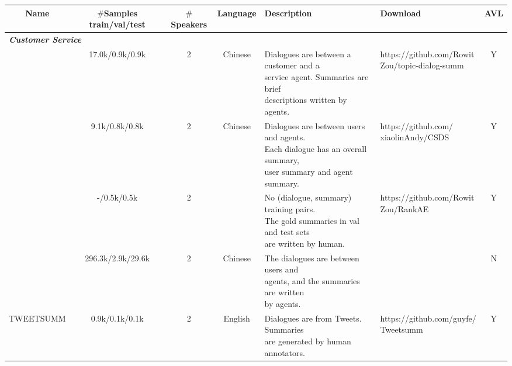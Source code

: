 \begin{sidewaystable}[thp]
	\centering
	\rule{0\textheight}{0.7\textheight}
	\begin{tabular}{|c|c|c|c|l|l|c|}
		
		\hline
		Name & \makecell{$\#$Samples \\ train/val/test} & $\#$Speakers & Language & Description & Download & AVL \\
		\hline
		\multicolumn{7}{|l|}{\bf \em{Customer Service}} \\
		\hline
		\tabincell{c}{\citet{zou2021topic}} & 17.0k/0.9k/0.9k%
		& 2 & Chinese & \tabincell{l}{Dialogues are between a customer and a \\ service agent. Summaries are brief \\descriptions written by agents.
		}&
		\tabincell{l}{https://github.com/Rowit\\Zou/topic-dialog-summ
		}& Y \\
		\hline
		\makecell{\citet{lin2021csds}} & 9.1k/0.8k/0.8k%
		& 2& Chinese &\tabincell{l}{Dialogues are between users and agents. \\Each dialogue has an overall summary, \\user summary and agent summary.} &\tabincell{l}{https://github.com/\\xiaolinAndy/CSDS} & Y\\
		\hline
		\makecell{\citet{zou2021unsupervised}} & -/0.5k/0.5k%
		& 2 &  \tabincell{l}{Chinese}& \tabincell{l}{No (dialogue, summary) training pairs. \\ The gold summaries in val and test sets \\are written by human.}& \tabincell{l}{https://github.com/Rowit\\Zou/RankAE} &Y \\
		\hline
		\tabincell{c}{Didi\cite{liu2019automatic}} &
		296.3k/2.9k/29.6k %
		& 2 & Chinese & \tabincell{l}{The dialogues are between users and \\agents, and the summaries are written \\ by agents.}&
		\tabincell{l}{-}& N \\
		\hline
		\tabincell{c}{TWEETSUMM\\ \cite{feigenblat-etal-2021-tweetsumm-dialog}} &
		0.9k/0.1k/0.1k %
		& 2 & English & \tabincell{l}{Dialogues are from Tweets. Summaries \\ are generated by human annotators.}&
		\tabincell{l}{https://github.com/guyfe/\\Tweetsumm}& Y \\

\end{tabular}
\end{sidewaystable}
